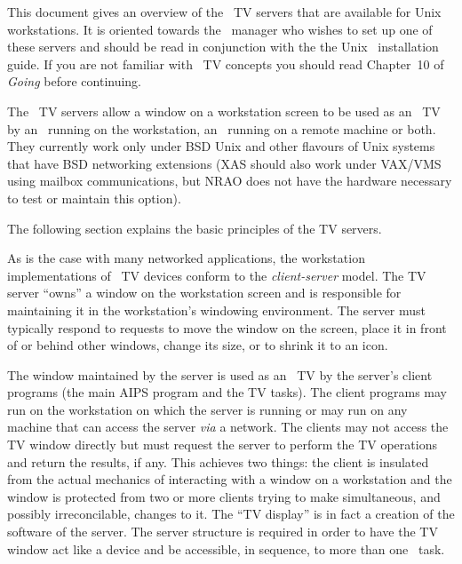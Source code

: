 \def\stitle{\AIPS\ TV Servers}
\def\ftitle{An Overview of the AIPS TV Servers}
\def\author{Chris Flatters}
\def\revisors{Dean M. Schlemmer, Pat Murphy, Eric Greisen, Mark Calabretta}
\def\mdate{February 4, 1991}
\def\memnumb{\phantom{9}} %

\memobegin


This document gives an overview of the \AIPS\ TV servers that are
available for Unix workstations.  It is oriented towards the \AIPS\
manager who wishes to set up one of these servers and should be read
in conjunction with the the Unix \AIPS\ installation guide.  If you are
not familiar with \AIPS\ TV concepts you should read Chapter~10 of
{\it Going \AIPS\/} before continuing.

The \AIPS\ TV servers allow a window on a workstation screen to be
used as an \AIPS\ TV by an \AIPS\ running on the workstation, an
\AIPS\ running on a remote machine or both.  They currently work only
under BSD Unix and other flavours of Unix systems that have BSD
networking extensions (XAS should also work under VAX/VMS using
mailbox communications, but NRAO does not have the hardware necessary
to test or maintain this option).

The following section explains the basic principles of the TV servers.


As is the case with many networked applications, the workstation
implementations of \AIPS\ TV devices conform to the {\it
client-server} model.  The TV server ``owns'' a window on the
workstation screen and is responsible for maintaining it in the
workstation's windowing environment.  The server must typically respond
to requests to move the window on the screen, place it in front of or
behind other windows, change its size, or to shrink it to an icon.

The window maintained by the server is used as an \AIPS\ TV by the
server's client programs (the main AIPS program and the TV tasks).
The client programs may  run on the workstation on which the server is
running or may run on any machine that can access the server {\it
via\/} a network.  The clients may not access the TV window directly
but must request the server to perform the TV operations and return
the results, if any.  This achieves two things: the client is
insulated from the actual mechanics of interacting with a window on a
workstation and the window is protected from two or more clients
trying to make simultaneous, and possibly irreconcilable, changes to
it.  The ``TV display'' is in fact a creation of the software of the
server.  The server structure is required in order to have the TV
window act like a device and be accessible, in sequence, to more than
one \AIPS\ task.

